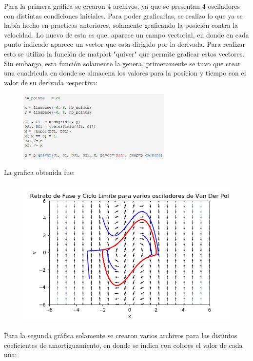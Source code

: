 \documentclass[12pt]{article}
\begin{document}
\pagebreak

Para la primera gráfica se crearon 4 archivos, ya que se presentan 4 osciladores con distintas condiciones iniciales. Para poder graficarlas, se realizo lo que ya se había hecho en practicas anteriores, solamente graficando la posición contra la velocidad. Lo nuevo de esta es que, aparece un campo vectorial, en donde en cada punto indicado aparece un vector que esta dirigido por la derivada. Para realizar esto se utilizo la función de matplot "quiver" que permite graficar estos vectores. Sin embargo, esta función solamente la genera, primeramente se tuvo que crear una cuadricula en donde se almacena los valores para la posicion y tiempo con el valor de su derivada respectiva: 

\begin{figure}[h!]
    \centering
\includegraphics[width=3in]{Cod2.png}
\end{figure}

La grafica obtenida fue:

\begin{figure}[h!]
    \centering
\includegraphics[width=5in]{Im1.png}
\end{figure}

Para la segunda gráfica solamente se crearon varios archivos para las distintos coeficientes de amortiguamiento, en donde se indica con colores el valor de cada una:
\end{document}
